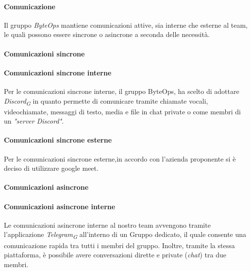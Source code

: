 \documentclass{article}
\begin{document}
\paragraph{Comunicazione}
Il gruppo \textit{ByteOps} mantiene comunicazioni attive, sia interne che esterne al team, le quali possono essere sincrone o asincrone a seconda delle necessità.
\paragraph{Comunicazioni sincrone}
\paragraph*{Comunicazioni sincrone interne}
Per le comunicazioni sincrone interne, il gruppo ByteOps, ha scelto di adottare \textit{Discord}\textsubscript{\textit{G}} in quanto permette di comunicare tramite chiamate vocali, videochiamate, messaggi di testo, media e file in chat private o come membri di un \textit{"server Discord"}.
\paragraph*{Comunicazioni sincrone esterne}
Per le comunicazioni sincrone esterne,in accordo con l'azienda proponente si è deciso di utilizzare google meet.
\paragraph{Comunicazioni asincrone}
\paragraph*{Comunicazioni asincrone interne}
Le comunicazioni asincrone interne al nostro team avvengono tramite l'applicazione \textit{Telegram}\textsubscript{\textit{G}} all'interno di un Gruppo dedicato, il quale consente una comunicazione rapida tra tutti i membri del gruppo. Inoltre, tramite la stessa piattaforma, è possibile avere conversazioni dirette e private (\textit{chat}) tra due membri.
\end{document}
